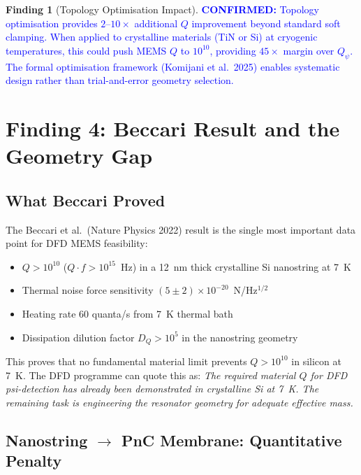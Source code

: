\documentclass[11pt]{article}
\theoremstyle{definition}
\newtheorem{finding}[theorem]{Finding}
\theoremstyle{remark}
\newcommand{\ee}[1]{\times 10^{#1}}
\newcommand{\Qpsi}{Q_\psi}
\newcommand{\confirmed}[1]{\textcolor{blue}{\textbf{CONFIRMED:} #1}}
\begin{document}
\begin{finding}[Topology Optimisation Impact]
\label{find:topo_opt}
\confirmed{Topology optimisation provides $2$--$10\times$ additional
$Q$ improvement beyond standard soft clamping. When applied to
crystalline materials (TiN or Si) at cryogenic temperatures, this
could push MEMS $Q$ to $10^{10}$, providing $45\times$ margin over
$\Qpsi$. The formal optimisation framework (Komijani et al.\ 2025)
enables systematic design rather than trial-and-error geometry
selection.}
\end{finding}


\section{Finding 4: Beccari Result and the Geometry Gap}
\label{sec:beccari}

\subsection{What Beccari Proved}

The Beccari et al.\ (Nature Physics 2022) result is the single
most important data point for DFD MEMS feasibility:

\begin{itemize}[nosep]
\item $Q > 10^{10}$ ($Q \cdot f > 10^{15}$~Hz) in a 12~nm thick
  crystalline Si nanostring at 7~K
\item Thermal noise force sensitivity
  $(5 \pm 2)\ee{-20}$~N/Hz$^{1/2}$
\item Heating rate 60 quanta/s from 7~K thermal bath
\item Dissipation dilution factor $D_Q > 10^5$ in the nanostring
  geometry
\end{itemize}

This proves that no fundamental material limit prevents $Q > 10^{10}$
in silicon at 7~K. The DFD programme can quote this as:
\textit{The required material $Q$ for DFD psi-detection has already
been demonstrated in crystalline Si at 7~K. The remaining task is
engineering the resonator geometry for adequate effective mass.}

\subsection{Nanostring $\to$ PnC Membrane: Quantitative Penalty}
\end{document}
